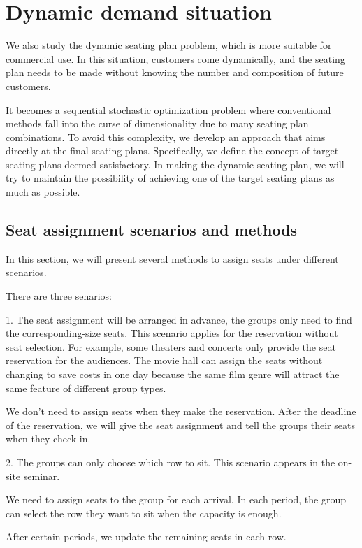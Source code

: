\section{Dynamic demand situation}\label{dynamic_demand}

We also study the dynamic seating plan problem, which is more suitable for commercial use. In this situation, customers come dynamically, and the seating plan needs to be made without knowing the number and composition of future customers. 

It becomes a sequential stochastic optimization problem where conventional methods fall into the curse of dimensionality due to many seating plan combinations. To avoid this complexity, we develop an approach that aims directly at the final seating plans. Specifically, we define the concept of target seating plans deemed satisfactory. In making the dynamic seating plan, we will try to maintain the possibility of achieving one of the target seating plans as much as possible.

\subsection{Seat assignment scenarios and methods}
In this section, we will present several methods to assign seats under different scenarios.

There are three senarios:

1. The seat assignment will be arranged in advance, the groups only need to find the corresponding-size seats. This scenario applies for the reservation without seat selection. For example, some theaters and concerts only provide the seat reservation for the audiences. The movie hall can assign the seats without changing to save costs in one day because the same film genre will attract the same feature of different group types.

We don't need to assign seats when they make the reservation. After the deadline of the reservation, we will give the seat assignment and tell the groups their seats when they check in.

2. The groups can only choose which row to sit. This scenario appears in the on-site seminar. 

We need to assign seats to the group for each arrival. In each period, the group can select the row they want to sit when the capacity is enough. 

After certain periods, we update the remaining seats in each row.


